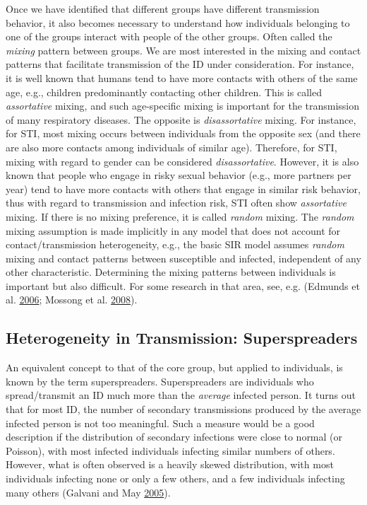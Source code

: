 \documentclass[]{article}
\theoremstyle{definition}
\theoremstyle{definition}
\theoremstyle{definition}
\theoremstyle{remark}
\begin{document}
Once we have identified that different groups have different
transmission behavior, it also becomes necessary to understand how
individuals belonging to one of the groups interact with people of the
other groups. Often called the \emph{mixing} pattern between groups. We
are most interested in the mixing and contact patterns that facilitate
transmission of the ID under consideration. For instance, it is well
known that humans tend to have more contacts with others of the same
age, e.g., children predominantly contacting other children. This is
called \emph{assortative} mixing, and such age-specific mixing is
important for the transmission of many respiratory diseases. The
opposite is \emph{disassortative} mixing. For instance, for STI, most
mixing occurs between individuals from the opposite sex (and there are
also more contacts among individuals of similar age). Therefore, for
STI, mixing with regard to gender can be considered
\emph{disassortative}. However, it is also known that people who engage
in risky sexual behavior (e.g., more partners per year) tend to have
more contacts with others that engage in similar risk behavior, thus
with regard to transmission and infection risk, STI often show
\emph{assortative} mixing. If there is no mixing preference, it is
called \emph{random} mixing. The \emph{random} mixing assumption is made
implicitly in any model that does not account for contact/transmission
heterogeneity, e.g., the basic SIR model assumes \emph{random} mixing
and contact patterns between susceptible and infected, independent of
any other characteristic. Determining the mixing patterns between
individuals is important but also difficult. For some research in that
area, see, e.g. (Edmunds et al. \protect\hyperlink{ref-edmunds06}{2006};
Mossong et al. \protect\hyperlink{ref-mossong08}{2008}).

\subsection{Heterogeneity in Transmission:
Superspreaders}\label{heterogeneity-in-transmission-superspreaders}

An equivalent concept to that of the core group, but applied to
individuals, is known by the term superspreaders. Superspreaders are
individuals who spread/transmit an ID much more than the \emph{average}
infected person. It turns out that for most ID, the number of secondary
transmissions produced by the average infected person is not too
meaningful. Such a measure would be a good description if the
distribution of secondary infections were close to normal (or Poisson),
with most infected individuals infecting similar numbers of others.
However, what is often observed is a heavily skewed distribution, with
most individuals infecting none or only a few others, and a few
individuals infecting many others (Galvani and May
\protect\hyperlink{ref-galvani05}{2005}).
\end{document}
